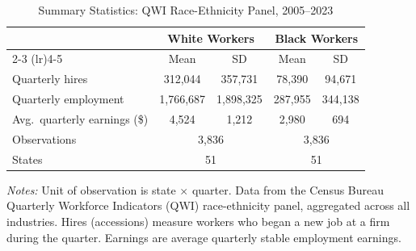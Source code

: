 \begin{table}[htbp]
\centering
\caption{Summary Statistics: QWI Race-Ethnicity Panel, 2005--2023}
\label{tab:sumstats}
\begin{tabular}{lcccc}
\hline\hline
 & \multicolumn{2}{c}{White Workers} & \multicolumn{2}{c}{Black Workers} \\
\cmidrule(lr){2-3} \cmidrule(lr){4-5}
 & Mean & SD & Mean & SD \\
\hline
Quarterly hires & 312,044 & 357,731 & 78,390 & 94,671 \\
Quarterly employment & 1,766,687 & 1,898,325 & 287,955 & 344,138 \\
Avg.\ quarterly earnings (\$) & 4,524 & 1,212 & 2,980 & 694 \\
\hline
Observations & \multicolumn{2}{c}{3,836} & \multicolumn{2}{c}{3,836} \\
States & \multicolumn{2}{c}{51} & \multicolumn{2}{c}{51} \\
\hline\hline
\end{tabular}
\begin{tablenotes}[flushleft]\small
\item \textit{Notes:} Unit of observation is state $\times$ quarter. Data from the Census Bureau Quarterly Workforce Indicators (QWI) race-ethnicity panel, aggregated across all industries. Hires (accessions) measure workers who began a new job at a firm during the quarter. Earnings are average quarterly stable employment earnings.
\end{tablenotes}
\end{table}

